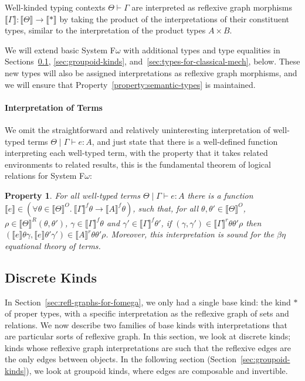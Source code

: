 \documentclass[preprint]{sigplanconf}
\newcommand{\sepbar}{\mathrel|}
\newtheorem{property}{Property}
\theoremstyle{examplestyle}
\newcommand{\sem}[1]{\llbracket #1 \rrbracket}
\newcommand{\semKU}[1]{\llbracket #1 \rrbracket^O}
\newcommand{\semKR}[1]{\llbracket #1 \rrbracket^R}
\begin{document}
Well-kinded typing contexts $\Theta \vdash \Gamma$ are interpreted as
reflexive graph morphisms $\sem{\Gamma} : \sem{\Theta} \to \sem{*}$ by
taking the product of the interpretations of their constituent types,
similar to the interpretation of the product types $A \times B$.

We will extend basic System F$\omega$ with additional types and type
equalities in Sections~\ref{sec:discrete-kinds},
\ref{sec:groupoid-kinds}, and~\ref{sec:types-for-classical-mech},
below. These new types will also be assigned interpretations as
reflexive graph morphisms, and we will ensure that
Property~\ref{property:semantic-types} is maintained.

\paragraph{Interpretation of Terms} We omit the straightforward and
relatively uninteresting interpretation of well-typed terms $\Theta
\sepbar \Gamma \vdash e : A$, and just state that there is a
well-defined function interpreting each well-typed term, with the
property that it takes related environments to related results, this
is the fundamental theorem of logical relations for System F$\omega$:

\begin{property}\label{property:semantic-terms}
  For all well-typed terms $\Theta \sepbar \Gamma \vdash e : A$ there
  is a function $\sem{e} \in (\forall \theta \in \semKU{\Theta}.\
  \sem{\Gamma}^f\theta \to \sem{A}^f\theta)$, such that, for all
  $\theta, \theta' \in \semKU{\Theta}$, $\rho \in
  \semKR{\Theta}(\theta,\theta')$, $\gamma \in \sem{\Gamma}^f\theta$
  and $\gamma' \in \sem{\Gamma}^f\theta'$, if $(\gamma, \gamma') \in
  \sem{\Gamma}^r\theta\theta'\rho$ then $(\sem{e}\theta\gamma,
  \sem{e}\theta'\gamma') \in \sem{A}^r\theta\theta'\rho$.  Moreover,
  this interpretation is sound for the $\beta\eta$ equational theory
  of terms.
\end{property}

\subsection{Discrete Kinds}
\label{sec:discrete-kinds}

In Section~\ref{sec:refl-graphs-for-fomega}, we only had a single base
kind: the kind $*$ of proper types, with a specific interpretation as
the reflexive graph of sets and relations. We now describe two
families of base kinds with interpretations that are particular sorts
of reflexive graph. In this section, we look at discrete kinds; kinds
whose reflexive graph interpretations are such that the reflexive
edges are the only edges between objects. In the following section
(Section~\ref{sec:groupoid-kinds}), we look at groupoid kinds, where
edges are composable and invertible.
\end{document}
